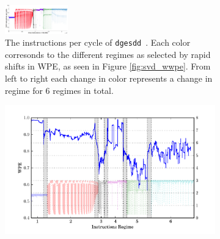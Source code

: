 \documentclass{article}
\newcommand{\svd}{{\tt dgesdd}~}
\begin{document}


\begin{figure}[htbp]
  \centering
         \caption{
[Joshua: I think adding the colored SVD trace to this would be good or putting it above this figure but need to figure how to line them up properly. Also we need to label that the numbers on the bottom of WPE are regimes not instructions...]]The weighted permutation entropy of one run of SVD. The gray bands
    are regions where the window overlaps regimes. The window size used is
    $5,000 \times 100,000$ instructions and the word length is $4$.}\label{fig:wwpe}
  \begin{subfigure}{0.3\textwidth}
    \includegraphics[width=0.3\textwidth]{figs/svdipcregimescolored.png}
    \caption{The instructions per cycle of \svd. Each color corresonds to the different regimes as selected by rapid shifts in WPE, as seen in Figure \ref{fig:svd_wwpe}. From left to right each change in color represents a change in regime for 6 regimes in total. }
    \label{fig:svd_ts}
  \end{subfigure}%
  \begin{subfigure}{\textwidth}
    \includegraphics[width=\textwidth]{figs/SVD_wwpe}

\end{subfigure}
\end{figure}
\end{document}
